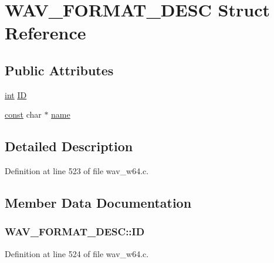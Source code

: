 \hypertarget{struct_w_a_v___f_o_r_m_a_t___d_e_s_c}{}\section{W\+A\+V\+\_\+\+F\+O\+R\+M\+A\+T\+\_\+\+D\+E\+SC Struct Reference}
\label{struct_w_a_v___f_o_r_m_a_t___d_e_s_c}
\subsection*{Public Attributes}
\begin{DoxyCompactItemize}
\item 
\hyperlink{xmltok_8h_a5a0d4a5641ce434f1d23533f2b2e6653}{int} \hyperlink{struct_w_a_v___f_o_r_m_a_t___d_e_s_c_ae253031e39d2ee1babbcc162070cbb71}{ID}
\item 
\hyperlink{getopt1_8c_a2c212835823e3c54a8ab6d95c652660e}{const} char $\ast$ \hyperlink{struct_w_a_v___f_o_r_m_a_t___d_e_s_c_a9ccaf4801b023f796d9f99bef47507f3}{name}
\end{DoxyCompactItemize}


\subsection{Detailed Description}


Definition at line 523 of file wav\+\_\+w64.\+c.



\subsection{Member Data Documentation}
\subsubsection[{\texorpdfstring{ID}{ID}}]{ W\+A\+V\+\_\+\+F\+O\+R\+M\+A\+T\+\_\+\+D\+E\+S\+C\+::\+ID}\hypertarget{struct_w_a_v___f_o_r_m_a_t___d_e_s_c_ae253031e39d2ee1babbcc162070cbb71}{}\label{struct_w_a_v___f_o_r_m_a_t___d_e_s_c_ae253031e39d2ee1babbcc162070cbb71}


Definition at line 524 of file wav\+\_\+w64.\+c.


